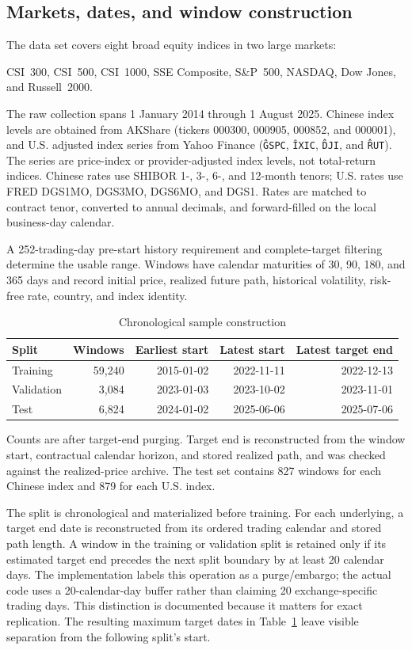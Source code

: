 ﻿\documentclass[12pt,letterpaper]{article}
\newcommand{\tabnote}[1]{\begin{minipage}{\linewidth}\vspace{4pt}\footnotesize\singlespacing #1\end{minipage}}
\begin{document}
\subsection{Markets, dates, and window construction}

The data set covers eight broad equity indices in two large markets:
\begin{center}
CSI~300, CSI~500, CSI~1000, SSE Composite, S\&P~500, NASDAQ, Dow Jones, and
Russell~2000.
\end{center}
The raw collection spans 1 January 2014 through 1 August 2025. Chinese index
levels are obtained from AKShare (tickers 000300, 000905, 000852, and 000001),
and U.S. adjusted index series from Yahoo Finance (\texttt{\^GSPC},
\texttt{\^IXIC}, \texttt{\^DJI}, and \texttt{\^RUT}). The series are price-index
or provider-adjusted index levels, not total-return indices. Chinese rates use
SHIBOR 1-, 3-, 6-, and 12-month tenors; U.S. rates use FRED DGS1MO, DGS3MO,
DGS6MO, and DGS1. Rates are matched to contract tenor, converted to annual
decimals, and forward-filled on the local business-day calendar.

A 252-trading-day
pre-start history requirement and complete-target filtering determine the
usable range. Windows have calendar maturities of 30, 90, 180, and 365
days and record initial price, realized future path, historical volatility,
risk-free rate, country, and index identity.

\begin{table}[ht]
\singlespacing
\centering
\caption{Chronological sample construction}
\label{tab:datasplit}
\begin{tabular}{lrrrr}
\toprule
Split & Windows & Earliest start & Latest start & Latest target end \\
\midrule
Training & 59{,}240 & 2015-01-02 & 2022-11-11 & 2022-12-13 \\
Validation & 3{,}084 & 2023-01-03 & 2023-10-02 & 2023-11-01 \\
Test & 6{,}824 & 2024-01-02 & 2025-06-06 & 2025-07-06 \\
\bottomrule
\end{tabular}
\tabnote{Counts are after target-end purging. Target end is reconstructed from
the window start, contractual calendar horizon, and stored realized path, and
was checked against the realized-price archive. The test set contains 827
windows for each Chinese index and 879 for each U.S. index.}
\end{table}

The split is chronological and materialized before training. For each
underlying, a target end date is reconstructed from its ordered trading
calendar and stored path length. A window in the training or validation split
is retained only if its estimated target end precedes the next split boundary
by at least 20 calendar days. The implementation labels this operation as a
purge/embargo; the actual code uses a 20-calendar-day buffer rather than
claiming 20 exchange-specific trading days. This distinction is documented
because it matters for exact replication. The resulting maximum target dates
in Table~\ref{tab:datasplit} leave visible separation from the following
split's start.
\end{document}
